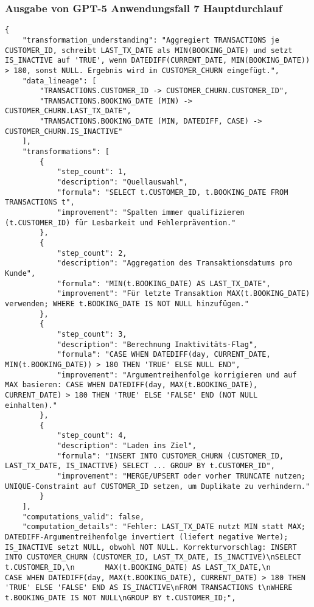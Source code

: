 \subsubsection{Ausgabe von GPT-5 Anwendungsfall 7 Hauptdurchlauf}\label{anhang:subsubsec:gpt_case7_prompt1}
\begin{lstlisting}[caption={Ausgabe: GPT-5 Anwendungsfall 7 Hauptdurchlauf},label={gpt_case7_prompt1}]
{
    "transformation_understanding": "Aggregiert TRANSACTIONS je CUSTOMER_ID, schreibt LAST_TX_DATE als MIN(BOOKING_DATE) und setzt IS_INACTIVE auf 'TRUE', wenn DATEDIFF(CURRENT_DATE, MIN(BOOKING_DATE)) > 180, sonst NULL. Ergebnis wird in CUSTOMER_CHURN eingefügt.",
    "data_lineage": [
        "TRANSACTIONS.CUSTOMER_ID -> CUSTOMER_CHURN.CUSTOMER_ID",
        "TRANSACTIONS.BOOKING_DATE (MIN) -> CUSTOMER_CHURN.LAST_TX_DATE",
        "TRANSACTIONS.BOOKING_DATE (MIN, DATEDIFF, CASE) -> CUSTOMER_CHURN.IS_INACTIVE"
    ],
    "transformations": [
        {
            "step_count": 1,
            "description": "Quellauswahl",
            "formula": "SELECT t.CUSTOMER_ID, t.BOOKING_DATE FROM TRANSACTIONS t",
            "improvement": "Spalten immer qualifizieren (t.CUSTOMER_ID) für Lesbarkeit und Fehlerprävention."
        },
        {
            "step_count": 2,
            "description": "Aggregation des Transaktionsdatums pro Kunde",
            "formula": "MIN(t.BOOKING_DATE) AS LAST_TX_DATE",
            "improvement": "Für letzte Transaktion MAX(t.BOOKING_DATE) verwenden; WHERE t.BOOKING_DATE IS NOT NULL hinzufügen."
        },
        {
            "step_count": 3,
            "description": "Berechnung Inaktivitäts-Flag",
            "formula": "CASE WHEN DATEDIFF(day, CURRENT_DATE, MIN(t.BOOKING_DATE)) > 180 THEN 'TRUE' ELSE NULL END",
            "improvement": "Argumentreihenfolge korrigieren und auf MAX basieren: CASE WHEN DATEDIFF(day, MAX(t.BOOKING_DATE), CURRENT_DATE) > 180 THEN 'TRUE' ELSE 'FALSE' END (NOT NULL einhalten)."
        },
        {
            "step_count": 4,
            "description": "Laden ins Ziel",
            "formula": "INSERT INTO CUSTOMER_CHURN (CUSTOMER_ID, LAST_TX_DATE, IS_INACTIVE) SELECT ... GROUP BY t.CUSTOMER_ID",
            "improvement": "MERGE/UPSERT oder vorher TRUNCATE nutzen; UNIQUE-Constraint auf CUSTOMER_ID setzen, um Duplikate zu verhindern."
        }
    ],
    "computations_valid": false,
    "computation_details": "Fehler: LAST_TX_DATE nutzt MIN statt MAX; DATEDIFF-Argumentreihenfolge invertiert (liefert negative Werte); IS_INACTIVE setzt NULL, obwohl NOT NULL. Korrekturvorschlag: INSERT INTO CUSTOMER_CHURN (CUSTOMER_ID, LAST_TX_DATE, IS_INACTIVE)\nSELECT t.CUSTOMER_ID,\n       MAX(t.BOOKING_DATE) AS LAST_TX_DATE,\n       CASE WHEN DATEDIFF(day, MAX(t.BOOKING_DATE), CURRENT_DATE) > 180 THEN 'TRUE' ELSE 'FALSE' END AS IS_INACTIVE\nFROM TRANSACTIONS t\nWHERE t.BOOKING_DATE IS NOT NULL\nGROUP BY t.CUSTOMER_ID;",

\end{lstlisting}
